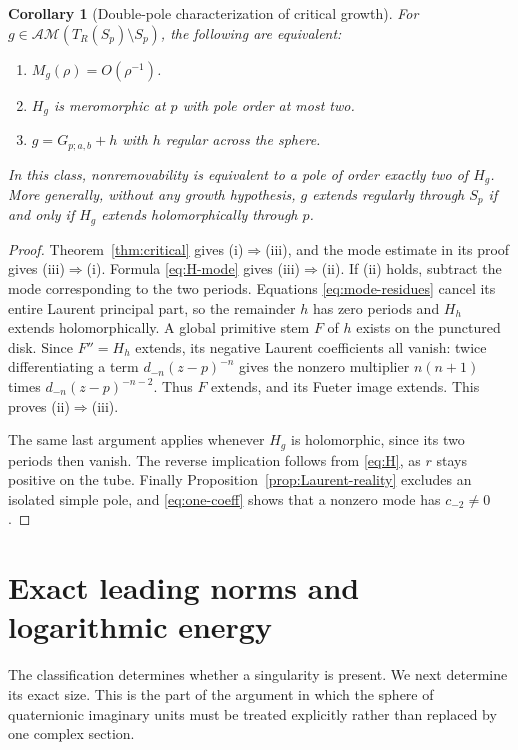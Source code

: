 \documentclass[11pt,a4paper]{article}
\numberwithin{equation}{section}
\newtheorem{corollary}[theorem]{Corollary}
\theoremstyle{definition}
\theoremstyle{remark}
\newcommand{\AM}{\mathcal{AM}}
\begin{document}
\begin{corollary}[Double-pole characterization of critical growth]
\label{cor:double-pole}
For $g\in\AM(T_R(S_p)\setminus S_p)$, the following are equivalent:
\begin{enumerate}[label=\textup{(\roman*)}]
\item $M_g(\rho)=O(\rho^{-1})$.
\item $H_g$ is meromorphic at $p$ with pole order at most two.
\item $g=G_{p;a,b}+h$ with $h$ regular across the sphere.
\end{enumerate}
In this class, nonremovability is equivalent to a pole of order exactly
two of $H_g$. More generally, without any growth hypothesis, $g$ extends
regularly through $S_p$ if and only if $H_g$ extends holomorphically through
$p$.
\end{corollary}
\begin{proof}
Theorem~\ref{thm:critical} gives (i)$\Rightarrow$(iii), and the mode
estimate in its proof gives (iii)$\Rightarrow$(i).
Formula \eqref{eq:H-mode} gives (iii)$\Rightarrow$(ii).
If (ii) holds, subtract the mode corresponding to the two periods.
Equations \eqref{eq:mode-residues} cancel its entire Laurent principal
part, so the remainder $h$ has zero periods and $H_h$ extends
holomorphically. A global primitive stem $F$ of $h$ exists on the
punctured disk. Since $F''=H_h$ extends, its negative Laurent
coefficients all vanish: twice differentiating a term
$d_{-n}(z-p)^{-n}$ gives the nonzero multiplier $n(n+1)$ times
$d_{-n}(z-p)^{-n-2}$. Thus $F$ extends, and its Fueter image extends.
This proves (ii)$\Rightarrow$(iii).

The same last argument applies whenever $H_g$ is holomorphic, since
its two periods then vanish. The reverse implication follows from
\eqref{eq:H}, as $r$ stays positive on the tube. Finally
Proposition~\ref{prop:Laurent-reality} excludes an isolated simple pole,
and \eqref{eq:one-coeff} shows that a nonzero mode has $c_{-2}\ne0$.
\end{proof}

\section{Exact leading norms and logarithmic energy}
\label{sec:energy}
The classification determines whether a singularity is present. We next
determine its exact size. This is the part of the argument in which the
sphere of quaternionic imaginary units must be treated explicitly rather
than replaced by one complex section.
\end{document}
